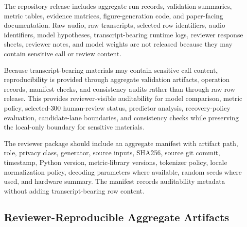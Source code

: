 \documentclass[
]{article}
\begin{document}
The repository release includes aggregate run records, validation
summaries, metric tables, evidence matrices, figure-generation code, and
paper-facing documentation. Raw audio, raw transcripts, selected row
identifiers, audio identifiers, model hypotheses, transcript-bearing
runtime logs, reviewer response sheets, reviewer notes, and model
weights are not released because they may contain sensitive call or
review content.

Because transcript-bearing materials may contain sensitive call content,
reproducibility is provided through aggregate validation artifacts,
operation records, manifest checks, and consistency audits rather than
through raw row release. This provides reviewer-visible auditability for
model comparison, metric policy, selected-300 human-review status,
predictor analysis, recovery-policy evaluation, candidate-lane
boundaries, and consistency checks while preserving the local-only
boundary for sensitive materials.

The reviewer package should include an aggregate manifest with artifact
path, role, privacy class, generator, source inputs, SHA256, source git
commit, timestamp, Python version, metric-library versions, tokenizer
policy, locale normalization policy, decoding parameters where
available, random seeds where used, and hardware summary. The manifest
records auditability metadata without adding transcript-bearing row
content.

\hypertarget{reviewer-reproducible-aggregate-artifacts}{%
\subsection{Reviewer-Reproducible Aggregate
Artifacts}\label{reviewer-reproducible-aggregate-artifacts}}
\end{document}
